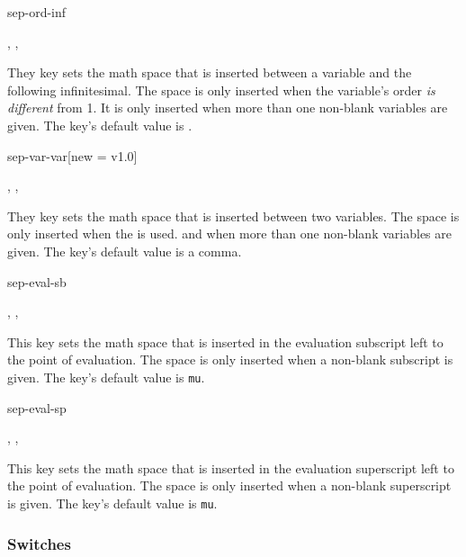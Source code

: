 	\begin{option}{sep-ord-inf}
		\begin{values}[default = \cs{mathop}\{\}\cs{!}]
			, , 
		\end{values}
		They key sets the math space that is inserted between a variable and the following infinitesimal. The space is only inserted when the variable's order \emph{is different} from \num{1}. It is only inserted when more than one non-blank variables are given. The key's default value is .
	\end{option}
	
	\begin{option}{sep-var-var}[new = v1.0]
		\begin{values}[default = {{,}}]
			, , 
		\end{values}
		They key sets the math space that is inserted between two variables. The space is only inserted when the  is used. and when more than one non-blank variables are given. The key's default value is a comma.
	\end{option}
	
	\begin{option}{sep-eval-sb}
		\begin{values}[default = 0]
			, , 
		\end{values}
		This key sets the math space that is inserted in the evaluation subscript left to the point of evaluation. The space is only inserted when a non-blank subscript is given. The key's default value is  \texttt{mu}.
	\end{option}
	
	\begin{option}{sep-eval-sp}
		\begin{values}[default = 0]
			, , 
		\end{values}
		This key sets the math space that is inserted in the evaluation superscript left to the point of evaluation. The space is only inserted when a non-blank superscript is given. The key's default value is  \texttt{mu}.
	\end{option}
	
	\clearpage
	
	\subsubsection*{Switches}
	
